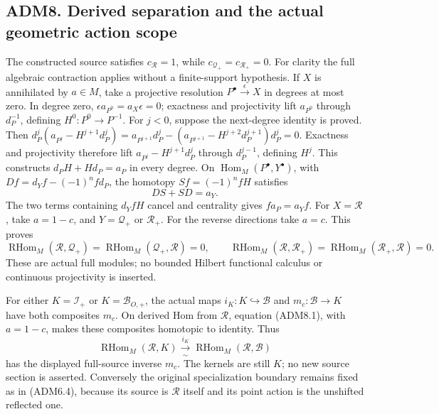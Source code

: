 \subsection{ADM8. Derived separation and the actual geometric action
scope}\label{adm8.-derived-separation-and-the-actual-geometric-action-scope}

The constructed source satisfies \(c_{\mathcal R}=1\), while
\(c_{\mathcal Q_+}=c_{\mathcal R_+}=0\). For clarity the full algebraic
contraction applies without a finite-support hypothesis. If \(X\) is
annihilated by \(a\in M\), take a projective resolution
\(P^\bullet\xrightarrow{\epsilon}X\) in degrees at most zero. In degree
zero, \(\epsilon a_{P^0}=a_X\epsilon=0\); exactness and projectivity
lift \(a_{P^0}\) through \(d_P^{-1}\), defining \(H^0:P^0\to P^{-1}\).
For \(j<0\), suppose the next-degree identity is proved. Then
\(d_P^j(a_{P^j}-H^{j+1}d_P^j)=a_{P^{j+1}}d_P^j-(a_{P^{j+1}}-H^{j+2}d_P^{j+1})d_P^j=0\).
Exactness and projectivity therefore lift \(a_{P^j}-H^{j+1}d_P^j\)
through \(d_P^{j-1}\), defining \(H^j\). This constructs
\(d_PH+Hd_P=a_P\) in every degree. On
\(\operatorname{Hom}_M(P^\bullet,Y^\bullet)\), with
\(Df=d_Yf-(-1)^nfd_P\), the homotopy \(Sf=(-1)^nfH\) satisfies \[
DS+SD=a_Y.
\tag{ADM8.1}
\] The two terms containing \(d_YfH\) cancel and centrality gives
\(fa_P=a_Yf\). For \(X=\mathcal R\), take \(a=1-c\), and
\(Y=\mathcal Q_+\) or \(\mathcal R_+\). For the reverse directions take
\(a=c\). This proves \[
\operatorname{RHom}_M(\mathcal R,\mathcal Q_+)
=\operatorname{RHom}_M(\mathcal Q_+,\mathcal R)=0,\qquad
\operatorname{RHom}_M(\mathcal R,\mathcal R_+)
=\operatorname{RHom}_M(\mathcal R_+,\mathcal R)=0.
\tag{ADM8.2}
\] These are actual full modules; no bounded Hilbert functional calculus
or continuous projectivity is inserted.

For either \(K=\mathcal I_+\) or \(K=\mathcal B_{O,+}\), the actual maps
\(i_K:K\hookrightarrow\mathcal B\) and \(m_c:\mathcal B\to K\) have both
composites \(m_c\). On derived Hom from \(\mathcal R\), equation
(ADM8.1), with \(a=1-c\), makes these composites homotopic to identity.
Thus \[
\operatorname{RHom}_M(\mathcal R,K)
\xrightarrow[\sim]{\,i_K\,}
\operatorname{RHom}_M(\mathcal R,\mathcal B)
\tag{ADM8.3}
\] has the displayed full-source inverse \(m_c\). The kernels are still
\(K\); no new source section is asserted. Conversely the original
specialization boundary remains fixed as in (ADM6.4), because its source
is \(\mathcal R\) itself and its point action is the unshifted reflected
one.

